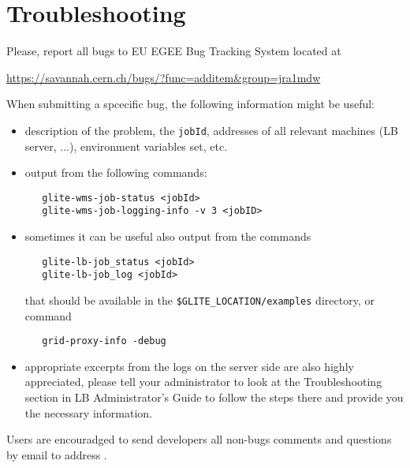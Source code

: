 \section{Troubleshooting}

Please, report all bugs to EU EGEE Bug Tracking System located at
\begin{center}
\url{https://savannah.cern.ch/bugs/?func=additem&group=jra1mdw}
\end{center}

When submitting a \LB spcecific bug, the following information might be useful:
\begin{itemize}
\item description of the problem, the \verb'jobId', addresses of all relevant
 machines (LB server, ...), environment variables set, etc.
\item output from the following commands:
\begin{verbatim}
   glite-wms-job-status <jobId>
   glite-wms-job-logging-info -v 3 <jobID>
\end{verbatim}
\item sometimes it can be useful also output from the commands
\begin{verbatim}
   glite-lb-job_status <jobId>
   glite-lb-job_log <jobId>
\end{verbatim}
that should be available in the \verb'$GLITE_LOCATION/examples' directory,
or command
\begin{verbatim}
   grid-proxy-info -debug
\end{verbatim}
\item appropriate excerpts from the logs on the server side are also highly appreciated, 
please tell your administrator to look at the Troubleshooting section in LB Administrator's 
Guide \cite{lbag} to follow the steps there and provide you the necessary information.
\end{itemize}

Users are encouradged to send developers all non-bugs comments and questions by email to
address .

